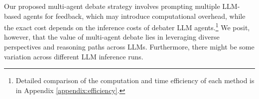 

Our proposed multi-agent debate strategy involves prompting multiple LLM-based agents for feedback, which may introduce computational overhead, while the exact cost depends on the inference costs of debater LLM agents.\footnote{Detailed comparison of the computation and time efficiency of each method is in Appendix \ref{appendix:efficiency}.} We posit, however, that the value of multi-agent debate lies in leveraging diverse perspectives and reasoning paths across LLMs. Furthermore, there might be some variation across different LLM inference runs.

